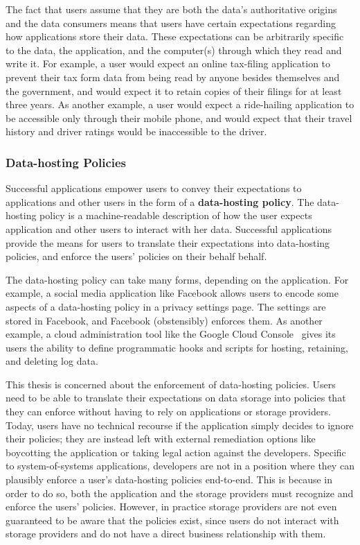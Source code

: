 The fact that users assume that they are both
the data's authoritative origins and the data consumers
means that users have certain expectations regarding how applications store
their data.  These expectations can be arbitrarily specific to the data, the application, and the
computer(s) through which they read and write it.  For example, a user would
expect an online tax-filing application to prevent their tax form data from being read by anyone
besides themselves and the government, and would expect it to retain copies of their 
filings for at least three years.  As another example, a user would expect a
ride-hailing application to be accessible only through their mobile phone, and
would expect that their travel history and driver ratings would be inaccessible
to the driver.

\subsubsection{Data-hosting Policies}

Successful applications empower users to convey their expectations to
applications and other users in the form of a \textbf{data-hosting policy}.
The data-hosting policy is a machine-readable
description of how the user expects application and other users to interact
with her data.  Successful applications provide the means for users to translate their
expectations into data-hosting policies, and enforce the users'
policies on their behalf behalf.

The data-hosting policy can take many forms, depending on the application.
For example, a social media application like Facebook allows
users to encode some aspects of a data-hosting policy in a privacy settings page.
The settings are stored in Facebook, and Facebook (obstensibly) enforces them.
As another example, a cloud administration tool like the Google Cloud
Console~\cite{google-cloud} gives its users the ability to define programmatic
hooks and scripts for hosting, retaining, and deleting log data.

This thesis is concerned about the enforcement of data-hosting policies.
Users need to be able to translate their expectations on data storage into
policies that they can enforce without having to rely on applications or storage
providers.  Today, users have no technical recourse if the application
simply decides to ignore their policies; they are instead left with external
remediation options like boycotting the application or taking legal action
against the developers.  Specific to system-of-systems applications,
developers are not in a position where they can plausibly enforce a user's data-hosting
policies end-to-end.  This is because in order to do so, 
both the application and the storage
providers must recognize and enforce the users' policies.  However, in practice storage
providers are not even guaranteed to be aware that the policies exist,
since users do not interact with storage providers and do not have a direct business
relationship with them.

